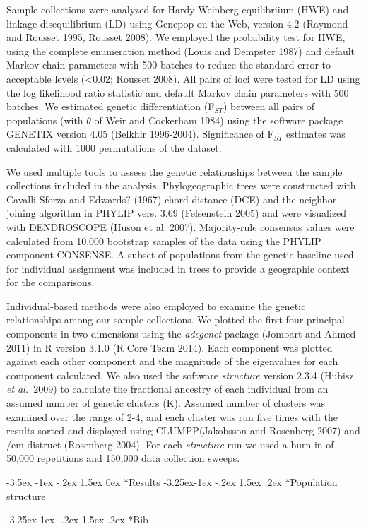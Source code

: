 \documentclass[twoside,10pt,twocolumn]{article}
\makeatletter
\newcommand{\etal}{{\em et al.}\ }
\renewcommand\section{\@startsection {section}{1}{\z@}%
                                   {-3.5ex \@plus -1ex \@minus -.2ex}%
                                   {1.5ex \@plus 0ex}%
                                   {\normalfont\normalsize\bfseries}}
\renewcommand\subsection{\@startsection{subsection}{2}{\z@}%
                                     {-3.25ex\@plus -1ex \@minus -.2ex}%
                                     {1.5ex \@plus .2ex}%
                                     {\normalfont\normalsize\itshape}}
\makeatother
\begin{document}
Sample collections were analyzed for Hardy-Weinberg equilibriium (HWE) and linkage disequilibrium (LD) using Genepop on the Web, 
version 4.2 (Raymond and Rousset 1995, Rousset 2008). We employed the probability test for HWE, using the complete enumeration 
method (Louis and Dempster 1987) and default Markov chain parameters with 500 batches to reduce the standard error to acceptable 
levels (<0.02; Rousset 2008).  All pairs of loci were tested for LD using the log likelihood ratio statistic and default Markov 
chain parameters with 500 batches.  We estimated genetic differentiation (F$_{ST}$) between all pairs of populations (with 
$\theta$ of Weir and Cockerham 1984) using the software package GENETIX version 4.05 (Belkhir 1996-2004). Significance of 
F$_{ST}$ estimates was calculated with 1000 permutations of the dataset. 

We used multiple tools to assess the genetic relationships between the sample collections included in the analysis. Phylogeographic trees were constructed with 
Cavalli-Sforza and Edwards? (1967) chord distance (DCE) and the neighbor-joining algorithm in PHYLIP vers. 3.69 (Felsenstein 2005) and were visualized with 
DENDROSCOPE (Huson et al. 2007). Majority-rule consensus values were calculated from 10,000 bootstrap samples of the data using the PHYLIP component 
CONSENSE.  A subset of populations from the genetic baseline used for individual assignment was included in trees to provide a geographic context for the 
comparisons. 

Individual-based methods were also employed to examine the genetic relationships among our sample collections. We plotted the first four principal components 
in two dimensions using the {\em adegenet} package (Jombart and Ahmed 2011) in R version 3.1.0 (R Core Team 2014). Each component was plotted against 
each other component and the magnitude of the eigenvalues for each component calculated. We also used the software {\em structure} version 2.3.4 (Hubisz 
\etal 2009) to calculate the fractional ancestry of each individual from an assumed number of genetic clusters (K). Assumed number of clusters was examined 
over the range of 2-4, and each cluster was run five times with the results sorted and displayed using CLUMPP(Jakobsson and Rosenberg 2007) and {/em 
distruct} (Rosenberg 2004). For each {\em structure} run we used a burn-in of 50,000 repetitions and 150,000 data collection sweeps.




\section*{Results}
\subsection*{Population structure}

\subsection*{Bib}
%

 
\end{document}
